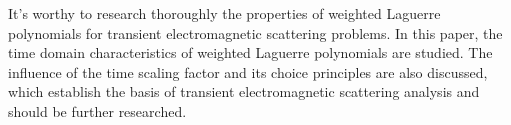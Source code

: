 \documentclass[conference, a4paper]{IEEEtran}
\begin{document}
It's worthy to research thoroughly the properties of weighted Laguerre
polynomials for transient electromagnetic scattering problems. In this
paper, the time domain characteristics of weighted Laguerre polynomials are
studied. The influence of the time scaling factor and its choice
principles are also discussed,
which establish the basis of transient
electromagnetic scattering analysis and should be further researched.



\enlargethispage{-12.5cm}



%
\end{document}
